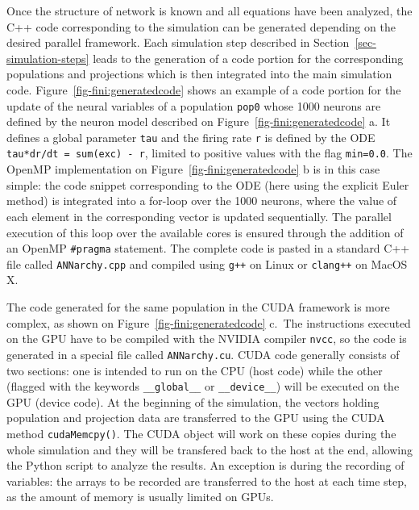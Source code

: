 \documentclass[
  11pt,
  a4paper,
]{scrbook}
\begin{document}
Once the structure of network is known and all equations have been
analyzed, the C++ code corresponding to the simulation can be generated
depending on the desired parallel framework. Each simulation step
described in Section~\ref{sec-simulation-steps} leads to the generation
of a code portion for the corresponding populations and projections
which is then integrated into the main simulation code.
Figure~\ref{fig-fini:generatedcode} shows an example of a code portion
for the update of the neural variables of a population \texttt{pop0}
whose 1000 neurons are defined by the neuron model described on
Figure~\ref{fig-fini:generatedcode} a. It defines a global parameter
\texttt{tau} and the firing rate \texttt{r} is defined by the ODE
\texttt{tau*dr/dt\ =\ sum(exc)\ -\ r}, limited to positive values with
the flag \texttt{min=0.0}. The OpenMP implementation on
Figure~\ref{fig-fini:generatedcode} b is in this case simple: the code
snippet corresponding to the ODE (here using the explicit Euler method)
is integrated into a for-loop over the 1000 neurons, where the value of
each element in the corresponding vector is updated sequentially. The
parallel execution of this loop over the available cores is ensured
through the addition of an OpenMP \texttt{\#pragma} statement. The
complete code is pasted in a standard C++ file called
\texttt{ANNarchy.cpp} and compiled using \texttt{g++} on Linux or
\texttt{clang++} on MacOS X.

The code generated for the same population in the CUDA framework is more
complex, as shown on Figure~\ref{fig-fini:generatedcode} c.~The
instructions executed on the GPU have to be compiled with the NVIDIA
compiler \texttt{nvcc}, so the code is generated in a special file
called \texttt{ANNarchy.cu}. CUDA code generally consists of two
sections: one is intended to run on the CPU (host code) while the other
(flagged with the keywords \texttt{\_\_global\_\_} or
\texttt{\_\_device\_\_}) will be executed on the GPU (device code). At
the beginning of the simulation, the vectors holding population and
projection data are transferred to the GPU using the CUDA method
\texttt{cudaMemcpy()}. The CUDA object will work on these copies during
the whole simulation and they will be transfered back to the host at the
end, allowing the Python script to analyze the results. An exception is
during the recording of variables: the arrays to be recorded are
transferred to the host at each time step, as the amount of memory is
usually limited on GPUs.
\end{document}
